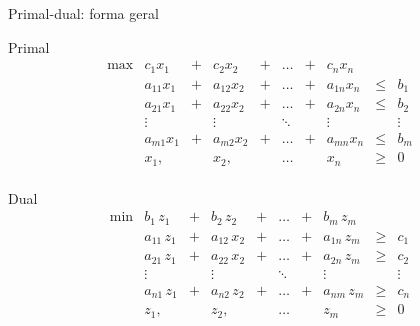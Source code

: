 \documentclass[compress,mathserif]{beamer}
\begin{document}
\begin{frame}{Primal-dual: forma geral}

\centering Primal
$$
\begin{matrix} 
\max & c_1 x_1 & + & c_2 x_2 & + & \dots & + & c_n x_n & \\
     & a_{11} x_1 & + & a_{12} x_2 & + & \dots  & + & a_{1n} x_n & \leq & b_1 \\
     & a_{21} x_1 & + & a_{22} x_2 & + & \dots  & + & a_{2n} x_n & \leq & b_2 \\
     & \vdots     &   & \vdots     &   & \ddots &   & \vdots     &           & \vdots \\
     & a_{m1} x_1 & + & a_{m2} x_2 & + & \dots  & + & a_{mn} x_n & \leq & b_m \\
     & x_1,       &   & x_2,       &   & \dots  &   &        x_n & \geq & 0 \\
\end{matrix}
$$

\vspace{0.3cm}

        \centering Dual
        $$\begin{matrix} 
\min& b_1\,z_1 & + & b_2\,z_2 & + & \dots & + & b_m\,z_m & \\
     & a_{11}\,z_1 & + & a_{12}\,x_2 & + & \dots  & + & a_{1n}\,z_m & \geq & c_1 \\
     & a_{21}\,z_1 & + & a_{22}\,x_2 & + & \dots  & + & a_{2n}\,z_m & \geq & c_2 \\
     & \vdots     &   & \vdots     &   & \ddots &   & \vdots     &           & \vdots \\
     & a_{n1}\,z_1 & + & a_{n2}\,z_2 & + & \dots  & + & a_{nm}\,z_m & \geq & c_n \\
     & z_1,       &   & z_2,       &   & \dots  &   &        z_m & \geq & 0 \\
\end{matrix}
$$
\end{frame}
\end{document}

